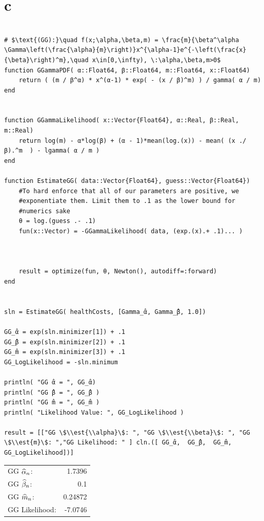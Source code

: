 \documentclass[12pt, letterpaper]{paper}
\begin{document}
\section{c}
\label{sec:org6ba1c64}
\begin{verbatim}

# $\text{(GG):}\quad f(x;\alpha,\beta,m) = \frac{m}{\beta^\alpha \Gamma\left(\frac{\alpha}{m}\right)}x^{\alpha-1}e^{-\left(\frac{x}{\beta}\right)^m},\quad x\in[0,\infty), \:\alpha,\beta,m>0$
function GGammaPDF( α::Float64, β::Float64, m::Float64, x::Float64)
    return ( (m / β^α) * x^(α-1) * exp( - (x / β)^m) ) / gamma( α / m)
end


function GGammaLikelihood( x::Vector{Float64}, α::Real, β::Real, m::Real)
    return log(m) - α*log(β) + (α - 1)*mean(log.(x)) - mean( (x ./ β).^m  ) - lgamma( α / m )    
end

function EstimateGG( data::Vector{Float64}, guess::Vector{Float64})
    #To hard enforce that all of our parameters are positive, we
    #exponentiate them. Limit them to .1 as the lower bound for
    #numerics sake
    θ = log.(guess .- .1)
    fun(x::Vector) = -GGammaLikelihood( data, (exp.(x).+ .1)... )



    result = optimize(fun, θ, Newton(), autodiff=:forward)
end


sln = EstimateGG( healthCosts, [Gamma_̂α, Gamma_̂β, 1.0])

GG_̂α = exp(sln.minimizer[1]) + .1
GG_̂β = exp(sln.minimizer[2]) + .1
GG_̂m = exp(sln.minimizer[3]) + .1
GG_LogLikelihood = -sln.minimum

println( "GG ̂α = ", GG_̂α)
println( "GG ̂β = ", GG_̂β )
println( "GG ̂m = ", GG_̂m )
println( "Likelihood Value: ", GG_LogLikelihood )

result = [["GG \$\\est{\\alpha}\$: ", "GG \$\\est{\\beta}\$: ", "GG \$\\est{m}\$: ","GG Likelihood: " ] cln.([ GG_̂α,  GG_̂β,  GG_̂m, GG_LogLikelihood])]

\end{verbatim}

\begin{center}
\begin{tabular}{lr}
GG \(\widehat{ \alpha }_{n}\): & 1.7396\\
GG \(\widehat{ \beta }_{n}\): & 0.1\\
GG \(\widehat{ m }_{n}\): & 0.24872\\
GG Likelihood: & -7.0746\\
\end{tabular}
\end{center}
\end{document}
